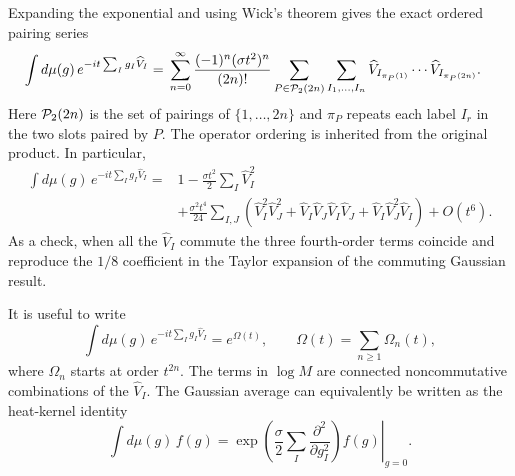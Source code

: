 \documentclass{article}
\theoremstyle{definition}
\begin{document}
Expanding the exponential and using Wick's theorem gives the exact ordered
pairing series
\begin{equation}
\begin{split}
    \int d\mu(g)\,
    e^{-it\sum_Ig_I\widehat V_I}
    ={}&
    \sum_{n=0}^{\infty}
    \frac{(-1)^n(\sigma t^2)^n}{(2n)!}
    \sum_{P\in{\cal P}_2(2n)}
    \sum_{I_1,\ldots,I_n}
    \widehat V_{I_{\pi_P(1)}}\cdots
    \widehat V_{I_{\pi_P(2n)}}.
\end{split}
\end{equation}
Here ${\cal P}_2(2n)$ is the set of pairings of $\{1,\ldots,2n\}$ and
$\pi_P$ repeats each label $I_r$ in the two slots paired by $P$.  The
operator ordering is inherited from the original product.  In particular,
\begin{align}
    \int d\mu(g)\,
    e^{-it\sum_Ig_I\widehat V_I}
    ={}&1-\frac{\sigma t^2}{2}\sum_I\widehat V_I^2
    \nonumber\\
    &+\frac{\sigma^2t^4}{24}
    \sum_{I,J}
    \left(
       \widehat V_I^2\widehat V_J^2
       +\widehat V_I\widehat V_J\widehat V_I\widehat V_J
       +\widehat V_I\widehat V_J^2\widehat V_I
    \right)
    +O(t^6).
\end{align}
As a check, when all the $\widehat V_I$ commute the three fourth-order terms
coincide and reproduce the $1/8$ coefficient in the Taylor expansion of the
commuting Gaussian result.

It is useful to write
\begin{equation}
    \int d\mu(g)\,
    e^{-it\sum_Ig_I\widehat V_I}
    =e^{\Omega(t)},
    \qquad
    \Omega(t)=\sum_{n\ge1}\Omega_n(t),
\end{equation}
where $\Omega_n$ starts at order $t^{2n}$.  The terms in $\log M$ are
connected noncommutative combinations of the $\widehat V_I$.  The Gaussian
average can equivalently be written as the heat-kernel identity
\begin{equation}
    \int d\mu(g)\,f(g)
    =
    \left.
    \exp\!\left(
       \frac{\sigma}{2}
       \sum_I\frac{\partial^2}{\partial g_I^2}
    \right)f(g)
    \right|_{g=0}.
\end{equation}
\end{document}
